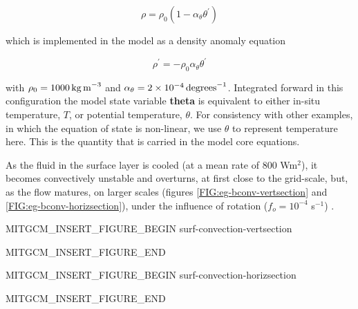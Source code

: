 \begin{equation}
\label{EQ:eg-bconv-linear1_eos}
\rho = \rho_{0} ( 1 - \alpha_{\theta}\theta^{'} )
\end{equation}

\noindent which is implemented in the model as a density anomaly equation

\begin{equation}
\label{EQ:eg-bconv-linear1_eos_pert}
\rho^{'} = -\rho_{0}\alpha_{\theta}\theta^{'}
\end{equation}

\noindent with $\rho_{0}=1000\,{\rm kg\,m}^{-3}$ and 
$\alpha_{\theta}=2\times10^{-4}\,{\rm degrees}^{-1} $. Integrated forward in
this configuration the model state variable {\bf theta} is equivalent to
either in-situ temperature, $T$, or potential temperature, $\theta$. For 
consistency with other examples, in which the equation of state is
non-linear, we use $\theta$ to represent temperature here. This is
the quantity that is carried in the model core equations.

As the fluid in the surface layer is cooled (at a mean rate of 800 Wm$^2$), it becomes 
convectively unstable and 
overturns, at first close to the grid-scale, but, as the flow matures, on larger scales 
(figures \ref{FIG:eg-bconv-vertsection} and \ref{FIG:eg-bconv-horizsection}), under the influence of 
rotation ($f_o = 10^{-4}$ s$^{-1}$) .

\begin{rawhtml}MITGCM_INSERT_FIGURE_BEGIN surf-convection-vertsection\end{rawhtml}
\begin{figure}
\begin{center}
\end{center}
\caption{
}
\label{FIG:eg-bconv-vertsection}
\label{fig:surf-convection-vertsection}
\end{figure}
\begin{rawhtml}MITGCM_INSERT_FIGURE_END\end{rawhtml}

\begin{rawhtml}MITGCM_INSERT_FIGURE_BEGIN surf-convection-horizsection\end{rawhtml}
\begin{figure}
\begin{center}
\end{center}
\caption{
}
\label{FIG:eg-bconv-horizsection}
\label{fig:surf-convection-horizsection}
\end{figure}
\begin{rawhtml}MITGCM_INSERT_FIGURE_END\end{rawhtml}

